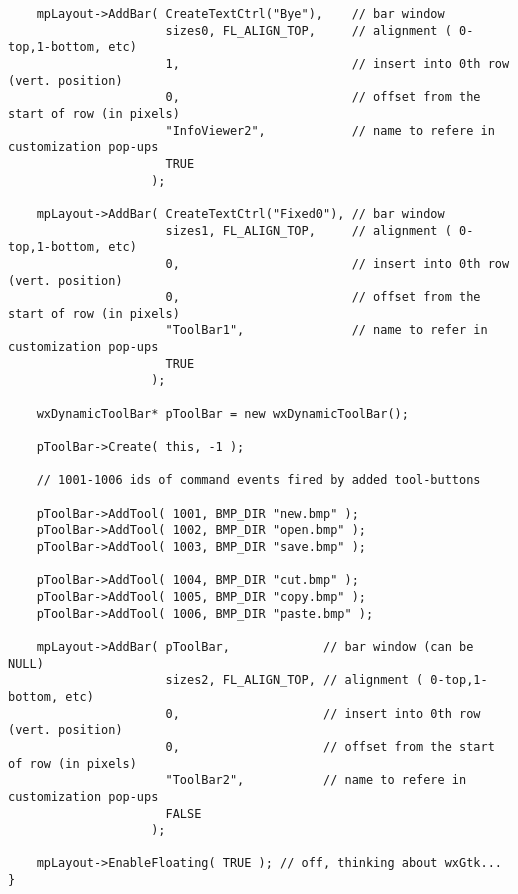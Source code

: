 \begin{verbatim}
    mpLayout->AddBar( CreateTextCtrl("Bye"),    // bar window
                      sizes0, FL_ALIGN_TOP,     // alignment ( 0-top,1-bottom, etc)
                      1,                        // insert into 0th row (vert. position)
                      0,                        // offset from the start of row (in pixels)
                      "InfoViewer2",            // name to refere in customization pop-ups
                      TRUE
                    );
    
    mpLayout->AddBar( CreateTextCtrl("Fixed0"), // bar window
                      sizes1, FL_ALIGN_TOP,     // alignment ( 0-top,1-bottom, etc)
                      0,                        // insert into 0th row (vert. position)
                      0,                        // offset from the start of row (in pixels)
                      "ToolBar1",               // name to refer in customization pop-ups
                      TRUE
                    );
    
    wxDynamicToolBar* pToolBar = new wxDynamicToolBar();
    
    pToolBar->Create( this, -1 );
    
    // 1001-1006 ids of command events fired by added tool-buttons
    
    pToolBar->AddTool( 1001, BMP_DIR "new.bmp" );
    pToolBar->AddTool( 1002, BMP_DIR "open.bmp" );
    pToolBar->AddTool( 1003, BMP_DIR "save.bmp" );
    
    pToolBar->AddTool( 1004, BMP_DIR "cut.bmp" );
    pToolBar->AddTool( 1005, BMP_DIR "copy.bmp" );
    pToolBar->AddTool( 1006, BMP_DIR "paste.bmp" );   
    
    mpLayout->AddBar( pToolBar,             // bar window (can be NULL)
                      sizes2, FL_ALIGN_TOP, // alignment ( 0-top,1-bottom, etc)
                      0,                    // insert into 0th row (vert. position)
                      0,                    // offset from the start of row (in pixels)
                      "ToolBar2",           // name to refere in customization pop-ups
                      FALSE
                    );
    
    mpLayout->EnableFloating( TRUE ); // off, thinking about wxGtk...
}
\end{verbatim}



